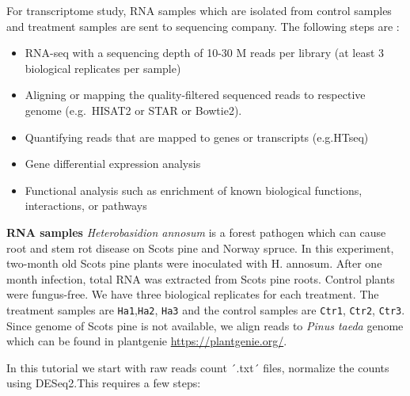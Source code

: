 \documentclass[
]{article}
\begin{document}
For transcriptome study, RNA samples which are isolated from control
samples and treatment samples are sent to sequencing company. The
following steps are :

\begin{itemize}
\item
  RNA-seq with a sequencing depth of 10-30 M reads per library (at least
  3 biological replicates per sample)
\item
  Aligning or mapping the quality-filtered sequenced reads to respective
  genome (e.g.~HISAT2 or STAR or Bowtie2).
\item
  Quantifying reads that are mapped to genes or transcripts (e.g.HTseq)
\item
  Gene differential expression analysis
\item
  Functional analysis such as enrichment of known biological functions,
  interactions, or pathways
\end{itemize}

\textbf{RNA samples} \emph{Heterobasidion annosum} is a forest pathogen
which can cause root and stem rot disease on Scots pine and Norway
spruce. In this experiment, two-month old Scots pine plants were
inoculated with H. annosum. After one month infection, total RNA was
extracted from Scots pine roots. Control plants were fungus-free. We
have three biological replicates for each treatment. The treatment
samples are \texttt{Ha1},\texttt{Ha2}, \texttt{Ha3} and the control
samples are \texttt{Ctr1}, \texttt{Ctr2}, \texttt{Ctr3}. Since genome of
Scots pine is not available, we align reads to \emph{Pinus taeda} genome
which can be found in plantgenie \url{https://plantgenie.org/}.

In this tutorial we start with raw reads count ´.txt´ files, normalize
the counts using DESeq2.This requires a few steps:
\end{document}
